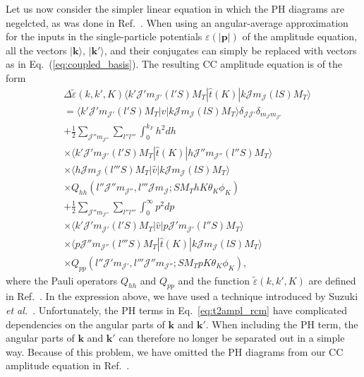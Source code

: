 \documentclass[a4paper,12pt]{report}
\begin{document}
Let us now consider the simpler linear equation in which the PH diagrams are negelcted, as was done in Ref.~\cite{baardsen}. When using an angular-average approximation for the inputs in the single-particle potentials $\varepsilon(|\mathbf{p}|) $ of the amplitude equation, all the vectors $| \mathbf{k}\rangle$, $|\mathbf{k}'\rangle $, and their conjugates can simply be replaced with vectors as in Eq.~(\ref{eq:coupled_basis}). The resulting CC amplitude equation is of the form  
  \begin{align} \label{eq:pphhlad_exact}
    &\Delta \tilde{\varepsilon }(k,k',K)\langle k'\mathcal{J}'m_{\mathcal{J}'}(l'S)M_{T}|\hat{t}(K)|k\mathcal{J}m_{\mathcal{J}}(lS)M_{T}\rangle \nonumber \\
    &=\langle k'\mathcal{J}'m_{\mathcal{J}'}(l'S)M_{T}|\hat{v}|k\mathcal{J}m_{\mathcal{J}}(lS)M_{T}\rangle \delta_{\mathcal{J}\mathcal{J}'}\delta_{m_{\mathcal{J}}m_{\mathcal{J}'}} \nonumber \\
    &+ \frac{1}{2}\sum_{\mathcal{J}''m_{\mathcal{J}''}}\sum_{l''l'''}\int_{0}^{k_{F}}h^{2}dh \nonumber \\
    &\times \langle k'\mathcal{J}'m_{\mathcal{J}'}(l'S)M_{T}|\hat{t}(K)|h\mathcal{J}''m_{\mathcal{J}''}(l''S)M_{T}\rangle \nonumber \\
    &\times \langle h\mathcal{J}m_{\mathcal{J}}(l'''S)M_{T}|\hat{v}|k\mathcal{J}m_{\mathcal{J}}(lS)M_{T}\rangle \nonumber \\
    &\times Q_{hh}(l''\mathcal{J}''m_{\mathcal{J}''},l'''\mathcal{J}m_{\mathcal{J}};SM_{T}hK\theta_{K}\phi_{K}) \nonumber \\
    &+ \frac{1}{2}\sum_{\mathcal{J}''m_{\mathcal{J}''}}\sum_{l''l'''}\int_{0}^{\infty }p^{2}dp \nonumber \\
    &\times \langle k'\mathcal{J}'m_{\mathcal{J}'}(l'S)M_{T}|\hat{v}|p\mathcal{J}'m_{\mathcal{J}'}(l''S)M_{T}\rangle \nonumber \\
    &\times \langle p\mathcal{J}''m_{\mathcal{J}''}(l'''S)M_{T}|\hat{t}(K)|k\mathcal{J}m_{\mathcal{J}}(lS)M_{T}\rangle \nonumber \\
    &\times Q_{pp}(l''\mathcal{J}'m_{\mathcal{J}'},l'''\mathcal{J}''m_{\mathcal{J}''};SM_{T}pK\theta_{K}\phi_{K}),
  \end{align}
where the Pauli operators $Q_{hh}$ and $Q_{pp}$ and the function $\tilde{\varepsilon }(k,k',K)$ are defined in Ref.~\cite{baardsen}. In the expression above, we have used a technique introduced by Suzuki \emph{et al.}~\cite{suzuki}. Unfortunately, the PH terms in Eq.~\ref{eq:t2ampl_rcm} have complicated dependencies on the angular parts of $\mathbf{k}$ and $\mathbf{k}'$. When including the PH term, the angular parts of $\mathbf{k}$ and $\mathbf{k}'$ can therefore no longer be separated out in a simple way. Because of this problem, we have omitted the PH diagrams from our CC amplitude equation in Ref.~\cite{baardsen}. 
\end{document}
